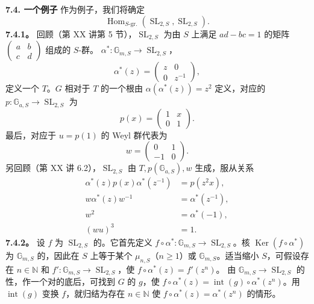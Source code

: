 \textbf{7.4. 一个例子}
作为例子，我们将确定
\[\operatorname{Hom}_{S\text{-gr.}}(\operatorname{SL}_{2,S},\operatorname{SL}_{2,S}).\]
\textbf{7.4.1。} 回顾（第 XX 讲第 5 节），$\operatorname{SL}_{2,S}$ 为由 $S$ 上满足 $ad-bc=1$ 的矩阵 $\left(\begin{smallmatrix}a&b\\c&d\end{smallmatrix}\right)$ 组成的 $S$-群。 $\alpha^*:\mathbb G_{m,S}\to\operatorname{SL}_{2,S}$，
\[\alpha^*(z)=\begin{pmatrix}z&0\\0&z^{-1}\end{pmatrix},\]
定义一个 $T$。$G$ 相对于 $T$ 的一个根由 $\alpha(\alpha^*(z))=z^2$ 定义，对应的 $p:\mathbb G_{a,S}\to\operatorname{SL}_{2,S}$ 为
\[p(x)=\begin{pmatrix}1&x\\0&1\end{pmatrix}.\]
最后，对应于 $u=p(1)$ 的 Weyl 群代表为
\[w=\begin{pmatrix}0&1\\-1&0\end{pmatrix}.\]
另回顾（第 XX 讲 6.2），$\operatorname{SL}_{2,S}$ 由 $T,p(\mathbb G_{a,S}),w$ 生成，服从关系
\[\begin{aligned}
\alpha^*(z)p(x)\alpha^*(z^{-1})&=p(z^2x),\\
w\alpha^*(z)w^{-1}&=\alpha^*(z^{-1}),\\
w^2&=\alpha^*(-1),\\(wu)^3&=1.
\end{aligned}\]
\textbf{7.4.2。} 设 $f$ 为 $\operatorname{SL}_{2,S}$ 的。它首先定义 $f\circ\alpha^*:\mathbb G_{m,S}\to\operatorname{SL}_{2,S}$。核 $\operatorname{Ker}(f\circ\alpha^*)$ 为 $\mathbb G_{m,S}$ 的，因此在 $S$ 上等于某个 $\mu_{n,S}$（$n\geq1$）或 $\mathbb G_{m,S}$。适当缩小 $S$，可假设存在 $n\in\mathbb N$ 和 $f':\mathbb G_{m,S}\to\operatorname{SL}_{2,S}$，使 $f\circ\alpha^*(z)=f'(z^n)$。
由 $\mathbb G_{m,S}\to\operatorname{SL}_{2,S}$ 的性，作一个对的底后，可找到 $G$ 的 $g$，使 $f\circ\alpha^*(z)=\operatorname{int}(g)\circ\alpha^*(z^n)$。用 $\operatorname{int}(g)$ 变换 $f$，就归结为存在 $n\in\mathbb N$ 使 $f\circ\alpha^*(z)=\alpha^*(z^n)$ 的情形。

